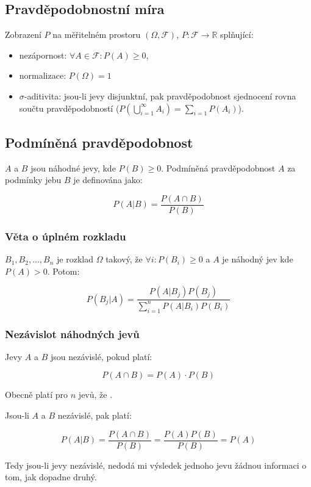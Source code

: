 \subsection{Pravděpodobnostní míra}

Zobrazení $P$ na měřitelném prostoru $(\Omega, \mathcal{F})$, $P: \mathcal{F} \rightarrow \mathbb{R}$ splňující:

\begin{itemize}
    \item nezápornost: $\forall{A} \in \mathcal{F}: P(A) \geq 0$,
    \item normalizace: $P(\Omega) = 1$
    \item $\sigma$-aditivita: jsou-li jevy disjunktní, pak pravděpodobnost sjednocení rovna součtu pravděpodobností ($P(\bigcup_{i=1}^{\infty}{A_i}) = \sum_{i=1}{P(A_i)}$).
\end{itemize}

\subsection{Podmíněná pravděpodobnost}

$A$ a $B$ jsou náhodné jevy, kde $P(B) \geq 0$. Podmíněná pravděpodobnost $A$ za podmínky jebu $B$ je definována jako:

$$
    P(A|B) = \frac{P(A \cap B)}{P(B)}
$$  

\subsubsection*{Věta o úplném rozkladu}
$B_1, B_2, \dots, B_n$ je rozklad $\Omega$ takový, že $\forall{i}: P(B_i) \geq 0$ a $A$ je náhodný jev kde $P(A) > 0$. Potom:

$$
    P(B_j|A) = \frac{P(A|B_j)P(B_j)}{\sum_{i=1}^{n}{P(A|B_i)P(B_i)}}
$$

\subsubsection*{Nezávislot náhodných jevů}

Jevy $A$ a $B$ jsou nezávislé, pokud platí:

$$
    P(A \cap B) = P(A) \cdot P(B)
$$

Obecně platí pro $n$ jevů, že .

Jsou-li $A$ a $B$ nezávislé, pak platí:

$$
    P(A|B) = \frac{P(A \cap B)}{P(B)} = \frac{P(A)P(B)}{P(B)} = P(A)
$$

Tedy jsou-li jevy nezávislé, nedodá mi výsledek jednoho jevu žádnou informaci o tom, jak dopadne druhý.
